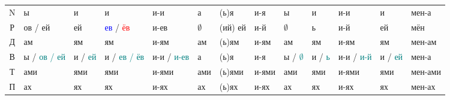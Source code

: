 \documentclass[a4paper, landscape, 11pt]{article}
\newcommand{\an}[1]{\textcolor{teal}{#1}} %
\newcommand{\us}[1]{\textcolor{blue}{#1}} %
\newcommand{\st}[1]{\textcolor{red}{#1}}  %
\begin{document}
\begin{tabularx}{\textwidth}{|c|XXXX|XXX|XXX|XX|}
	  N    & ы                    & и                 & и                 & и-и             & а           & (ь)я     & и-я    & ы                    & и                 & и-и            & и                     & мен-а                  \\
	  Р    & ов / ей              & ей                & \us{ев} / \st{ёв} & и-ев            & $\emptyset$ & (ий) ей  & и-й    & $\emptyset$          & ь                 & и-й            & ей                    & мён                    \\
	  Д    & ам                   & ям                & ям                & и-ям            & ам          & (ь)ям    & и-ям   & ам                   & ям                & и-ям           & ям                    & мен-ам                 \\
	  В    & ы / \an{ов / ей}     & и / \an{ей}       & и / \an{ев / ёв}  & и-и / \an{и-ев} & а           & (ь)я     & и-я    & ы / \an{$\emptyset$} & и / \an{ь}        & и-и / \an{и-й} & и / \an{ей}           & мен-а                  \\
	  Т    & ами                  & ями               & ями               & и-ями           & ами         & (ь)ями   & и-ями  & ами                  & ями               & и-ями          & ями                   & мен-ами                \\
	  П    & ах                   & ях                & ях                & и-ях            & ах          & (ь)ях    & и-ях   & ах                   & ях                & и-ях           & ях                    & мен-ах                 \\ \hline
\end{tabularx}
\end{document}
